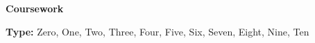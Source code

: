 \vspace{0.25mm}
\begin{center}
    \textbf{Coursework}
\end{center}

\textbf{Type:} Zero, One, Two, Three, Four, Five, Six, Seven, Eight, Nine, Ten\\
